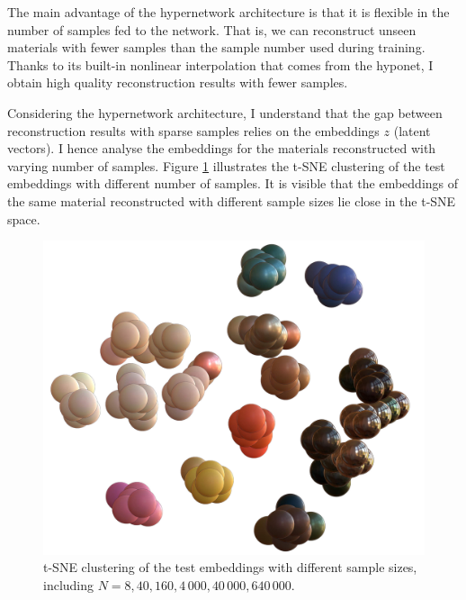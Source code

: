 The main advantage of the hypernetwork architecture is that it is flexible in the number of samples fed to the network. That is, we can reconstruct unseen materials with fewer samples than the sample number used during training. Thanks to its built-in nonlinear interpolation that comes from the hyponet, I obtain high quality reconstruction results with fewer samples. 

Considering the hypernetwork architecture, I understand that the gap between reconstruction results with sparse samples relies on the embeddings $z$ (latent vectors). I hence analyse the embeddings for the materials reconstructed with varying number of samples. Figure \ref{fig:tsne-vis-imputation} illustrates the t-SNE clustering of the test embeddings with different number of samples. It is visible that the embeddings of the same material reconstructed with different sample sizes lie close in the t-SNE space.

\begin{figure}[t]
  \centering
   \includegraphics[width=0.8\linewidth]{Chapters/hyperbrdf-figs/tsne6_2_den1-cropped-compressed.pdf}
   \caption{t-SNE clustering of the test embeddings with different sample sizes, including $N=8, 40, 160, 4\,000, 40\,000, 640\,000$.}

   \label{fig:tsne-vis-imputation}
\end{figure}


